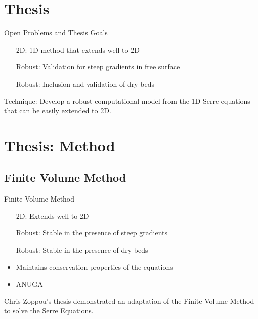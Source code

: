 \documentclass[]{beamer}
\begin{document}
\section{Thesis}

\begin{frame}{Open Problems and Thesis Goals}
	\begin{itemize}
		\item[2D:] 1D method that extends well to 2D
		\item[Robust:] Validation for steep gradients in free surface
		\item[Robust:] Inclusion and validation of dry beds
	\end{itemize}		
	\medskip
	\pause
	Technique: Develop a robust computational model from the 1D Serre equations that can be easily extended to 2D. 
\end{frame}

\section{Thesis: Method}
\subsection{Finite Volume Method}
\begin{frame}{Finite Volume Method}
\begin{itemize}
	\item[2D:] Extends well to 2D
	\item[Robust:] Stable in the presence of steep gradients
	\item[Robust:] Stable in the presence of dry beds
	\item Maintains conservation properties of the equations
	\item ANUGA
\end{itemize}
\pause  Chris Zoppou's thesis demonstrated an adaptation of the Finite Volume Method to solve the Serre Equations.
\end{frame}
\end{document}
